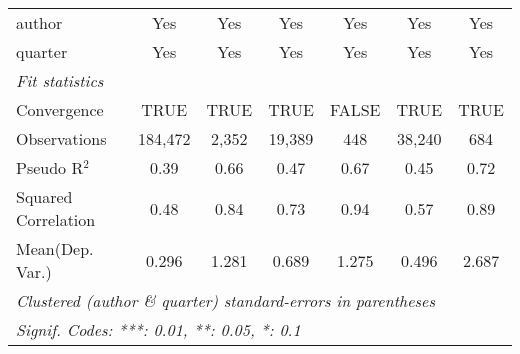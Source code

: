 \begin{tabular}{lcccccc}
   author                                                     & Yes           & Yes           & Yes            & Yes           & Yes           & Yes\\  
   quarter                                                    & Yes           & Yes           & Yes            & Yes           & Yes           & Yes\\  
   \midrule
   \emph{Fit statistics}\\
   Convergence                                                &TRUE           & TRUE          & TRUE           & FALSE         & TRUE          & TRUE\\  
   Observations                                               & 184,472       & 2,352         & 19,389         & 448           & 38,240        & 684\\  
   Pseudo R$^2$                                               & 0.39          & 0.66          & 0.47           & 0.67          & 0.45          & 0.72\\  
   Squared Correlation                                        & 0.48          & 0.84          & 0.73           & 0.94          & 0.57          & 0.89\\  
Mean(Dep. Var.) & 0.296 & 1.281 & 0.689 & 1.275 & 0.496 & 2.687 \\
   \midrule \midrule
   \multicolumn{7}{l}{\emph{Clustered (author \& quarter) standard-errors in parentheses}}\\
   \multicolumn{7}{l}{\emph{Signif. Codes: ***: 0.01, **: 0.05, *: 0.1}}\\
\end{tabular}
\par\endgroup
